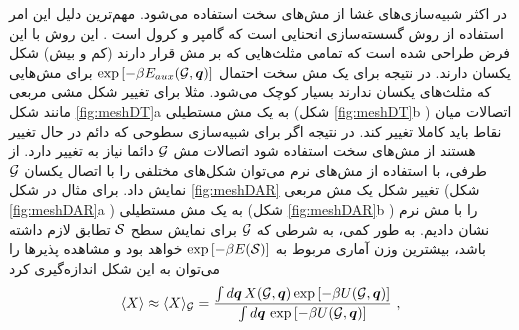 در اکثر شبیه‌سازی‌های غشا از مش‌های سخت استفاده می‌شود. مهم‌ترین دلیل این امر استفاده از روش گسسته‌سازی انحنایی است که گامپر و کرول است
\cite{gompperkroll1996}
. این روش با این فرض طراحی شده است که تمامی مثلث‌هایی که بر مش قرار دارند (کم و بیش) شکل یکسان دارند. در نتیجه برای یک مش سخت احتمال
 $\exp\left[-\beta E_{aux}({\cal G}, {\bm q})\right]$
برای مش‌هایی که مثلث‌های یکسان ندارند بسیار کوچک می‌شود. مثلا برای تغییر شکل مشی مربعی مانند شکل 
\ref{fig:meshDT}a
به یک مش مستطیلی (شکل
\ref{fig:meshDT}b
) اتصالات میان نقاط باید کاملا تغییر کند. در نتیجه اگر برای شبیه‌سازی سطوحی که دائم در حال تغییر هستند از مش‌های سخت استفاده شود اتصالات مش
$\cal G$
دائما نیاز به تغییر دارد. از طرفی، با استفاده از مش‌های نرم می‌توان شکل‌های مختلفی را با اتصال یکسان
$\cal G$
نمایش داد. برای مثال در شکل
\ref{fig:meshDAR}
تغییر شکل یک مش مربعی (شکل
\ref{fig:meshDAR}a
) به یک مش مستطیلی (شکل
\ref{fig:meshDAR}b
) را با مش نرم نشان دادیم. به طور کمی، به شرطی که 
${\cal G}$
برای نمایش سطح
${\cal S}$
تطابق لازم داشته باشد، بیشترین وزن آماری مربوط به 
$\exp\left[-\beta E({\cal S})\right]$
خواهد بود و مشاهده‌ پذیر‌ها را می‌توان به این شکل اندازه‌گیری کرد
\begin{equation}\label{eq:<A(M)> soft meshes}
\langle X \rangle \approx
\langle X \rangle_{\cal G} = \frac{\int d {\bm q}\, X({\cal G}, {\bm q}) \exp\left[-\beta U({\cal G}, {\bm q})\right] } 
                                                  { \int d {\bm q}\,                                \exp\left[-\beta U({\cal G}, {\bm q})\right] }\ ,
\end{equation}















